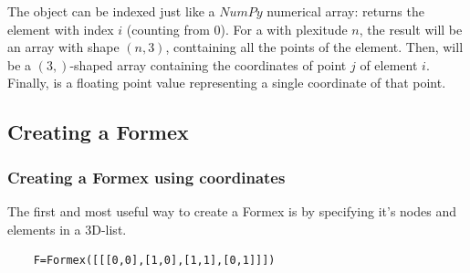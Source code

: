 The  object  can be indexed just like a $NumPy$ numerical array:  returns the element with index $i$ (counting from $0$). For a  with plexitude $n$, the result will be an array with shape $(n,3)$, conttaining all the points of the element. Then,  will be a $(3,)$-shaped array containing the coordinates of point $j$ of element $i$. Finally,  is a floating point value representing a single coordinate of that point. 







\subsection{Creating a Formex}
\label{subsec:create}


\subsubsection{Creating a Formex using coordinates}
The first and most useful way to create a Formex is by specifying it's nodes and elements in a 3D-list.  

\begin{verbatim}
	F=Formex([[[0,0],[1,0],[1,1],[0,1]]])
\end{verbatim}

